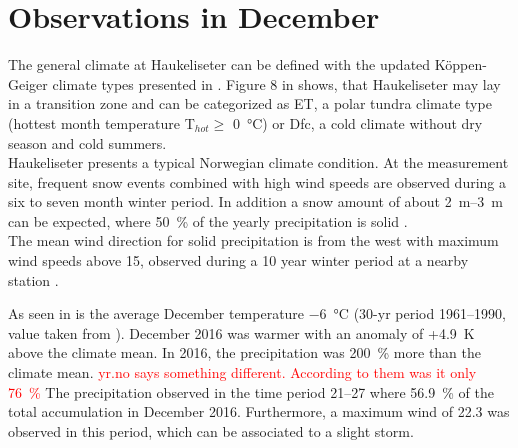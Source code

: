 \section{Observations in December}
The general climate at Haukeliseter can be defined with the updated K\"oppen-Geiger climate types presented in \cite{peel_updated_2007}. Figure 8 in \cite{peel_updated_2007} shows, that Haukeliseter may lay in a transition zone and can be categorized as  ET, a polar tundra climate type (hottest month temperature T$_{hot}\ge$ \SI{0}{\celsius}) or Dfc, a cold climate without dry season and cold summers. 
\\
Haukeliseter presents a typical Norwegian climate condition. At the measurement site, frequent snow events combined with high wind speeds are observed during a six to seven month winter period. In addition a snow amount of about \SIrange{2}{3}{\m} can be expected, where \SI{50}{\percent} of the yearly precipitation is solid \citep{wolff_new_2010, wolff_measurements_2013, wolff_derivation_2015}. \\
The mean wind direction for solid precipitation is from the west with maximum wind speeds above \SI{15}{\mPs}, observed during a 10 year winter period at a nearby station \citep{wolff_new_2010, wolff_derivation_2015}. 

\noindent As seen in  is the average December temperature \SI{-6}{\celsius} (30-yr period \numrange{1961}{1990}, value taken from \cite{eklima_norwegian_2016}). 
December 2016 was warmer with an anomaly of +\SI{4.9}{\kelvin} above the climate mean. 
In 2016, the precipitation was \SI{200}{\percent} more than the climate mean. \textcolor{red}{yr.no says something different. According to them was it only \SI{76}{\percent}} 
The precipitation observed in the time period \SIrange{21}{27}{\dec} where \SI{56.9}{\percent} of the total accumulation in December 2016. Furthermore, a maximum wind of \SI{22.3}{\mPs} was observed in this period, which can be associated to a slight storm.

